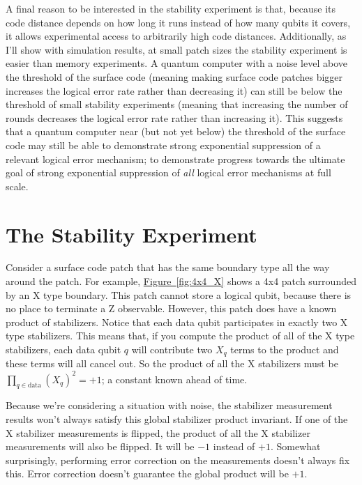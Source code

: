 \documentclass[onecolumn,unpublished,a4paper]{quantumarticle}
\theoremstyle{definition}
\theoremstyle{definition}
\theoremstyle{definition}
\newcommand{\fig}[1]{\hyperref[fig:#1]{Figure~\ref*{fig:#1}}}
\begin{document}
A final reason to be interested in the stability experiment is that, because its code distance depends on how long it runs instead of how many qubits it covers, it allows experimental access to arbitrarily high code distances.
Additionally, as I'll show with simulation results, at small patch sizes the stability experiment is easier than memory experiments.
A quantum computer with a noise level above the threshold of the surface code (meaning making surface code patches bigger increases the logical error rate rather than decreasing it) can still be below the threshold of small stability experiments (meaning that increasing the number of rounds decreases the logical error rate rather than increasing it).
This suggests that a quantum computer near (but not yet below) the threshold of the surface code may still be able to demonstrate strong exponential suppression of a relevant logical error mechanism; to demonstrate progress towards the ultimate goal of strong exponential suppression of \emph{all} logical error mechanisms at full scale.

\section{The Stability Experiment}

Consider a surface code patch that has the same boundary type all the way around the patch.
For example, \fig{4x4_X} shows a 4x4 patch surrounded by an X type boundary.
This patch cannot store a logical qubit, because there is no place to terminate a Z observable.
However, this patch does have a known product of stabilizers.
Notice that each data qubit participates in exactly two X type stabilizers.
This means that, if you compute the product of all of the X type stabilizers, each data qubit $q$ will contribute two $X_q$ terms to the product and these terms will all cancel out.
So the product of all the X stabilizers must be $\prod_{q \in \text{data}} (X_q)^2 = +1$; a constant known ahead of time.

Because we're considering a situation with noise, the stabilizer measurement results won't always satisfy this global stabilizer product invariant.
If one of the X stabilizer measurements is flipped, the product of all the X stabilizer measurements will also be flipped.
It will be $-1$ instead of $+1$.
Somewhat surprisingly, performing error correction on the measurements doesn't always fix this.
Error correction doesn't guarantee the global product will be $+1$.
\end{document}
